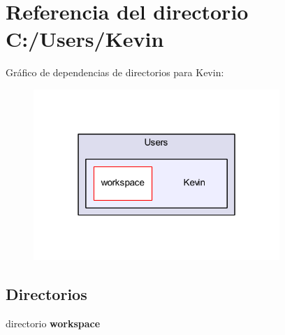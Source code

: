 \section{Referencia del directorio C\-:/\-Users/\-Kevin}
\label{dir_6970052ad77975467f99ba5f3c21f895}
Gráfico de dependencias de directorios para Kevin\-:\nopagebreak
\begin{figure}[H]
\begin{center}
\leavevmode
\includegraphics[width=264pt]{dir_6970052ad77975467f99ba5f3c21f895_dep}
\end{center}
\end{figure}
\subsection*{Directorios}
\begin{DoxyCompactItemize}
\item 
directorio {\bf workspace}
\end{DoxyCompactItemize}
